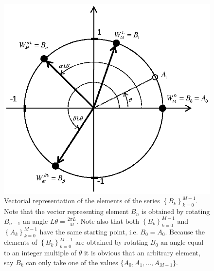 \documentclass[a4paper,11pt,oneside]{article}
\begin{document}
\begin{figure}[h!]
\centering
\includegraphics[width=.6\textwidth]{argandB.eps}
\caption{Vectorial representation of the elements of the series $\left\{B_{k}\right\}_{k=0}^{M-1}$. Note that the vector representing element $B_{n}$ is obtained by rotating $B_{n-1}$ an angle $L\theta=\frac{2\pi L}{M}$. Note also that both $\left\{B_{k}\right\}_{k=0}^{M-1}$ and $\left\{A_{k}\right\}_{k=0}^{M-1}$ have the same starting point, i.e. $B_0=A_0$. Because the elements of $\left\{B_{k}\right\}_{k=0}^{M-1}$ are obtained by rotating $B_{0}$ an angle equal to an integer multiple of $\theta$ it is obvious that an arbitrary element, say $B_{k}$ can only take one of the values $\{A_{0},A_1,...,A_{M-1}\}$.}
\label{argandB}
\end{figure}
\end{document}
